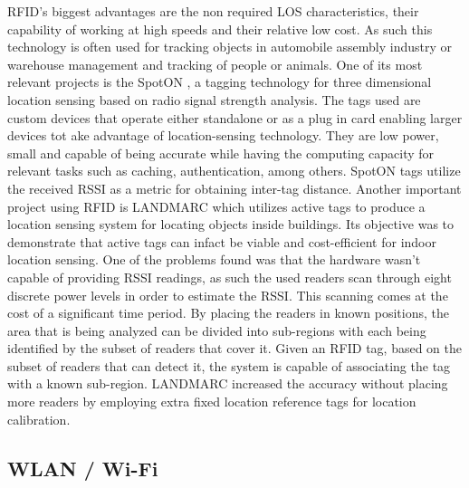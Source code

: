 \ac{RFID}'s biggest advantages are the non required \ac{LOS} characteristics, their capability of working at high speeds and their relative low cost. As such this technology is often used for tracking objects in automobile assembly industry or warehouse management and tracking of people or animals.
One of its most relevant projects is the SpotON \cite{spoton}, a tagging technology for three dimensional location sensing based on radio signal strength analysis. The tags used are custom devices that operate either standalone or as a plug in card enabling larger devices tot ake advantage of location-sensing technology. They are low power, small and capable of being accurate while having the computing capacity for relevant tasks such as caching, authentication, among others. SpotON tags utilize the received \ac{RSSI} as a metric for obtaining inter-tag distance.
Another important project using \ac{RFID} is LANDMARC which utilizes active tags to produce a location sensing system for locating objects inside buildings. Its objective was to demonstrate that active tags can infact be viable and cost-efficient for indoor location sensing. One of the problems found was that the hardware wasn't capable of providing \ac{RSSI} readings, as such the used readers scan through eight discrete power levels in order to estimate the \ac{RSSI}. This scanning comes at the cost of a significant time period. By placing the readers in known positions, the area that is being analyzed can be divided into sub-regions with each being identified by the subset of readers that cover it. Given an RFID tag, based on the subset of readers that can detect it, the system is capable of associating the tag with a known sub-region. LANDMARC increased the accuracy without placing more
readers by employing extra fixed location reference tags for location calibration.


\subsection{WLAN / Wi-Fi}
\label{subsec:wifi}

